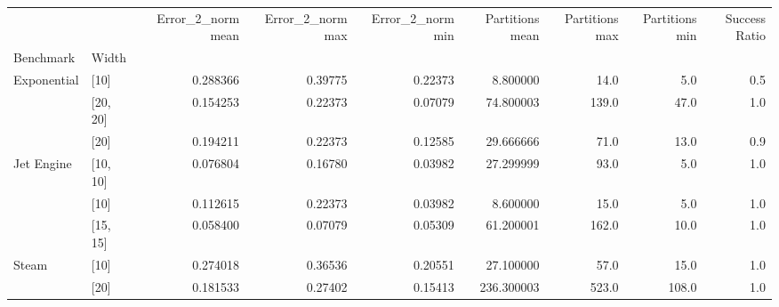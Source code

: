 \begin{tabular}{llrrrrrrr}
\toprule
      &      &  Error\_2\_norm mean &  Error\_2\_norm max &  Error\_2\_norm min &  Partitions mean &  Partitions max &  Partitions min &  Success Ratio \\
Benchmark & Width &                    &                   &                   &                  &                 &                 &                \\
\midrule
Exponential & [10] &           0.288366 &           0.39775 &           0.22373 &         8.800000 &            14.0 &             5.0 &            0.5 \\
      & [20, 20] &           0.154253 &           0.22373 &           0.07079 &        74.800003 &           139.0 &            47.0 &            1.0 \\
      & [20] &           0.194211 &           0.22373 &           0.12585 &        29.666666 &            71.0 &            13.0 &            0.9 \\
Jet Engine & [10, 10] &           0.076804 &           0.16780 &           0.03982 &        27.299999 &            93.0 &             5.0 &            1.0 \\
      & [10] &           0.112615 &           0.22373 &           0.03982 &         8.600000 &            15.0 &             5.0 &            1.0 \\
      & [15, 15] &           0.058400 &           0.07079 &           0.05309 &        61.200001 &           162.0 &            10.0 &            1.0 \\
Steam & [10] &           0.274018 &           0.36536 &           0.20551 &        27.100000 &            57.0 &            15.0 &            1.0 \\
      & [20] &           0.181533 &           0.27402 &           0.15413 &       236.300003 &           523.0 &           108.0 &            1.0 \\
\bottomrule
\end{tabular}
